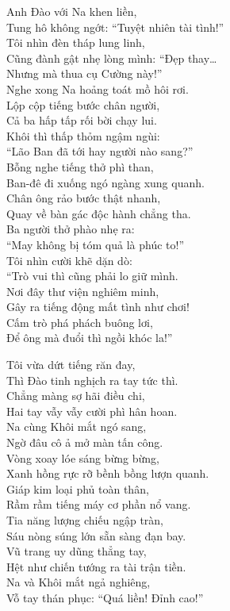 \documentclass[../main.tex]{subfiles}
\begin{document}
\begin{center}

  Anh Đào với Na khen liền,\\
  Tung hô không ngớt: ``Tuyệt nhiên tài tình!''\\
  Tôi nhìn đèn tháp lung linh,\\
  Cũng đành gật nhẹ lòng mình: ``Đẹp thay\dots\\
  Nhưng mà thua cụ Cường này!''\\
  Nghe xong Na hoảng toát mồ hôi rơi.\\
  Lộp cộp tiếng bước chân người,\\
  Cả ba hấp tấp rối bời chạy lui.\\
  Khôi thì thấp thỏm ngậm ngùi:\\
  ``Lão Ban đã tới hay người nào sang?''\\
  Bỗng nghe tiếng thở phì than,\\
  Ban-đê đi xuống ngó ngàng xung quanh.\\
  Chân ông rảo bước thật nhanh,\\
  Quay về bàn gác độc hành chẳng tha.\\
  Ba người thở phào nhẹ ra:\\
  ``May không bị tóm quả là phúc to!''\\
  Tôi nhìn cười khẽ dặn dò:\\
  ``Trò vui thì cũng phải lo giữ mình.\\
  Nơi đây thư viện nghiêm minh,\\
  Gây ra tiếng động mất tình như chơi!\\
  Cấm trò phá phách buông lơi,\\
  Để ông mà đuổi thì ngồi khóc la!''


  Tôi vừa dứt tiếng răn đay,\\
  Thì Đào tinh nghịch ra tay tức thì.\\
  Chẳng màng sợ hãi điều chi,\\
  Hai tay vẫy vẫy cười phì hân hoan.\\
  Na cùng Khôi mắt ngó sang,\\
  Ngờ đâu cô ả mở màn tấn công.\\
  Vòng xoay lóe sáng bừng bừng,\\
  Xanh hồng rực rỡ bềnh bồng lượn quanh.\\
  Giáp kim loại phủ toàn thân,\\
  Rầm rầm tiếng máy cơ phần nổ vang.\\
  Tia năng lượng chiếu ngập tràn,\\
  Sáu nòng súng lớn sẵn sàng đạn bay.\\
  Vũ trang uy dũng thẳng tay,\\
  Hệt như chiến tướng ra tài trận tiền.\\
  Na và Khôi mắt ngả nghiêng,\\
  Vỗ tay thán phục: ``Quá liền! Đỉnh cao!''


\end{center}
\end{document}
